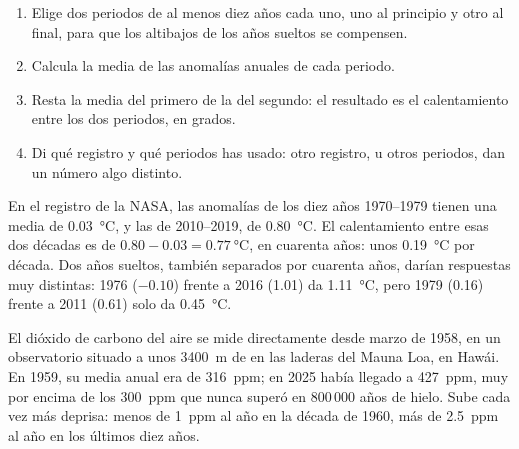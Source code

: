 \begin{method}
\begin{enumerate}
  \item Elige dos periodos de al menos diez años cada uno, uno al
        principio y otro al final, para que los altibajos de los años
        sueltos se compensen.
  \item Calcula la media de las anomalías anuales de cada periodo.
  \item Resta la media del primero de la del segundo: el resultado es el
        calentamiento entre los dos periodos, en grados.
  \item Di qué registro y qué periodos has usado: otro registro, u otros
        periodos, dan un número algo distinto.
\end{enumerate}
\end{method}

\begin{example}
En el registro de la NASA, las anomalías de los diez años 1970--1979
tienen una media de \qty{0.03}{\degreeCelsius}, y las de 2010--2019, de
\qty{0.80}{\degreeCelsius}. El calentamiento entre esas dos décadas es de
$0.80 - 0.03 = \qty{0.77}{\degreeCelsius}$, en cuarenta años: unos
\qty{0.19}{\degreeCelsius} por década. Dos años sueltos, también separados
por cuarenta años, darían respuestas muy distintas: 1976 ($-0.10$) frente a
2016 (1.01) da \qty{1.11}{\degreeCelsius}, pero 1979 (0.16) frente a 2011
(0.61) solo da \qty{0.45}{\degreeCelsius}.
\end{example}

El dióxido de carbono del aire se mide directamente desde marzo de 1958,
en un observatorio situado a unos \qty{3400}{m} de  en las laderas
del  Mauna Loa, en Hawái. En 1959, su media anual era de
\qty{316}{ppm}; en 2025 había llegado a \qty{427}{ppm}, muy por encima de
los \qty{300}{ppm} que nunca superó en 800\,000 años de hielo. Sube cada
vez más deprisa: menos de \qty{1}{ppm} al año en la década de 1960, más de
\qty{2.5}{ppm} al año en los últimos diez años.

